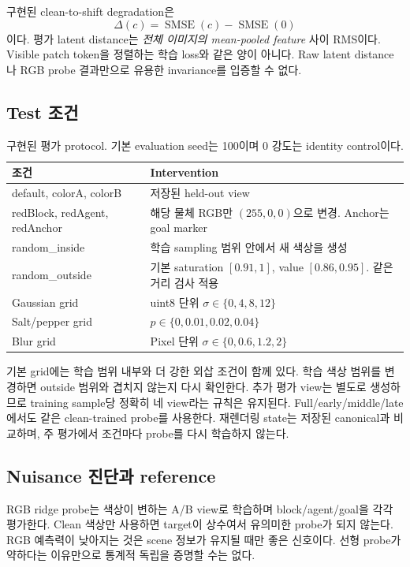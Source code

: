 \documentclass[11pt,a4paper]{article}
\begin{document}
구현된 clean-to-shift degradation은
\begin{equation}
\Delta(c)=\operatorname{SMSE}(c)-\operatorname{SMSE}(0)
\end{equation}
이다. 평가 latent distance는 \emph{전체 이미지의 mean-pooled feature} 사이 RMS이다.
Visible patch token을 정렬하는 학습 loss와 같은 양이 아니다.
Raw latent distance나 RGB probe 결과만으로 유용한 invariance를 입증할 수 없다.

\subsection{Test 조건}
\begin{table}[htbp]\centering\small
\begin{tabularx}{\linewidth}{lX}
\toprule 조건 & Intervention \\\midrule
default, colorA, colorB & 저장된 held-out view \\
redBlock, redAgent, redAnchor & 해당 물체 RGB만 $(255,0,0)$으로 변경. Anchor는 goal marker \\
random\_inside & 학습 sampling 범위 안에서 새 색상을 생성 \\
random\_outside & 기본 saturation $[0.91,1]$, value $[0.86,0.95]$. 같은 거리 검사 적용 \\
Gaussian grid & uint8 단위 $\sigma\in\{0,4,8,12\}$ \\
Salt/pepper grid & $p\in\{0,0.01,0.02,0.04\}$ \\
Blur grid & Pixel 단위 $\sigma\in\{0,0.6,1.2,2\}$ \\\bottomrule
\end{tabularx}
\caption{구현된 평가 protocol. 기본 evaluation seed는 100이며 0 강도는 identity control이다.}
\end{table}
기본 grid에는 학습 범위 내부와 더 강한 외삽 조건이 함께 있다. 학습 색상 범위를
변경하면 outside 범위와 겹치지 않는지 다시 확인한다. 추가 평가 view는 별도로
생성하므로 training sample당 정확히 네 view라는 규칙은 유지된다.
Full/early/middle/late에서도 같은 clean-trained probe를 사용한다.
재렌더링 state는 저장된 canonical과 비교하며, 주 평가에서 조건마다 probe를 다시
학습하지 않는다.

\subsection{Nuisance 진단과 reference}
RGB ridge probe는 색상이 변하는 A/B view로 학습하며 block/agent/goal을 각각
평가한다. Clean 색상만 사용하면 target이 상수여서 유의미한 probe가 되지 않는다.
RGB 예측력이 낮아지는 것은 scene 정보가 유지될 때만 좋은 신호이다.
선형 probe가 약하다는 이유만으로 통계적 독립을 증명할 수는 없다.
\end{document}
